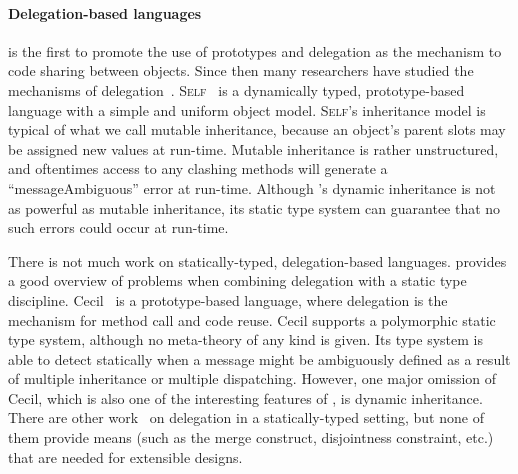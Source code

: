 



\paragraph{Delegation-based languages}

\citet{lieberman1986using} is the first to promote the use of prototypes and
delegation as the mechanism to code sharing between objects. Since then many
researchers have studied the mechanisms of
delegation~\cite{wegner1987dimensions,malenfant1995semantic,goldberg1989smalltalk}.
\textsc{Self}~\cite{ungar1988self} is a dynamically typed, prototype-based
language with a simple and uniform object model. \textsc{Self}'s inheritance
model is typical of what we call mutable inheritance, because an object's parent
slots may be assigned new values at run-time. Mutable inheritance is rather
unstructured, and oftentimes access to any clashing methods will generate a
``messageAmbiguous'' error at run-time. Although \name's dynamic inheritance is
not as powerful as mutable inheritance, its static type system can guarantee
that no such errors could occur at run-time.

There is not much work on statically-typed, delegation-based languages.
\citet{kniesel1999type} provides a good overview of problems when combining
delegation with a static type discipline. Cecil~\cite{chambers1992object,
  chambers1993cecil} is a prototype-based language, where delegation is the
mechanism for method call and code reuse. Cecil supports a polymorphic static
type system, although no meta-theory of any kind is given. Its type system is
able to detect statically when a message might be ambiguously defined as a
result of multiple inheritance or multiple dispatching. However, one major
omission of Cecil, which is also one of the interesting features of \name, is
dynamic inheritance. There are other
work~\cite{fisher1995delegation,anderson2003can} on delegation in a
statically-typed setting, but none of them provide means (such as the merge
construct, disjointness constraint, etc.) that are needed for extensible
designs.

